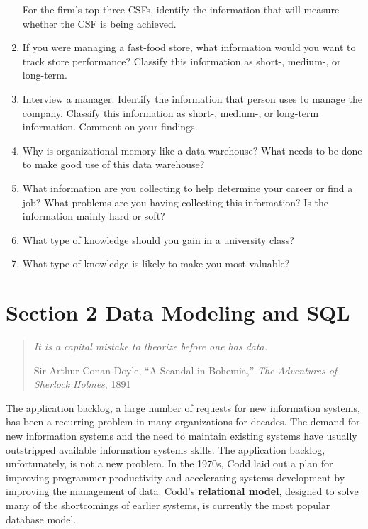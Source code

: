 \documentclass[
]{article}
\begin{document}
\begin{enumerate}
  For the firm's top three CSFs, identify the information that will
  measure whether the CSF is being achieved.
\item
  If you were managing a fast-food store, what information would you
  want to track store performance? Classify this information as
  short-, medium-, or long-term.
\item
  Interview a manager. Identify the information that person uses to
  manage the company. Classify this information as short-, medium-, or
  long-term information. Comment on your findings.
\item
  Why is organizational memory like a data warehouse? What needs to be
  done to make good use of this data warehouse?
\item
  What information are you collecting to help determine your career or
  find a job? What problems are you having collecting this
  information? Is the information mainly hard or soft?
\item
  What type of knowledge should you gain in a university class?
\item
  What type of knowledge is likely to make you most valuable?
\end{enumerate}

\newpage

\hypertarget{section-2-data-modeling-and-sql}{%
\section*{Section 2 Data Modeling and SQL}\label{section-2-data-modeling-and-sql}}

\begin{quote}
\emph{It is a capital mistake to theorize before one has data.}

Sir Arthur Conan Doyle, ``A Scandal in Bohemia,'' \emph{The Adventures of
Sherlock Holmes}, 1891
\end{quote}

The application backlog, a large number of requests for new information
systems, has been a recurring problem in many organizations for decades.
The demand for new information systems and the need to maintain existing
systems have usually outstripped available information systems skills.
The application backlog, unfortunately, is not a new problem. In the
1970s, Codd laid out a plan for improving programmer productivity and
accelerating systems development by improving the management of data.
Codd's \textbf{relational model}, designed to solve many of the shortcomings
of earlier systems, is currently the most popular database model.
\end{document}
